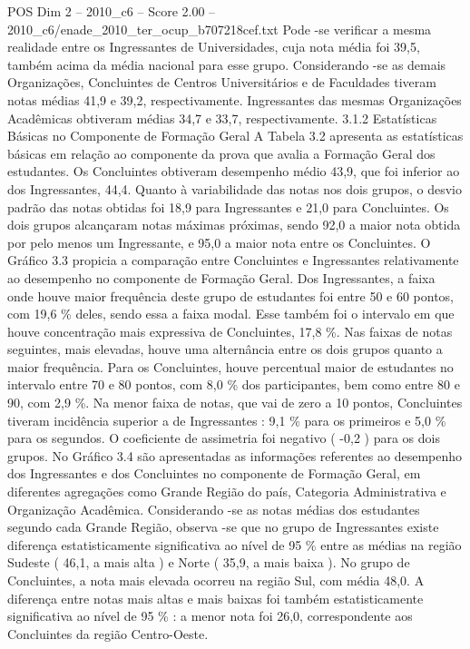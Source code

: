 \begin{textsample}{POS Dim 2 – 2010\_c6 – Score 2.00 – 2010\_c6/enade\_2010\_ter\_ocup\_b707218cef.txt}
Pode -se verificar a mesma realidade entre os Ingressantes de Universidades, cuja nota média foi 39,5, também acima da média nacional para esse grupo.
Considerando -se as demais Organizações, Concluintes de Centros Universitários e de Faculdades tiveram notas médias 41,9 e 39,2, respectivamente.
Ingressantes das mesmas Organizações Acadêmicas obtiveram médias 34,7 e 33,7, respectivamente. 3.1.2 Estatísticas Básicas no Componente de Formação Geral A Tabela 3.2 apresenta as estatísticas básicas em relação ao componente da prova que avalia a Formação Geral dos estudantes.
Os Concluintes obtiveram desempenho médio 43,9, que foi inferior ao dos Ingressantes, 44,4.
Quanto à variabilidade das notas nos dois grupos, o desvio padrão das notas obtidas foi 18,9 para Ingressantes e 21,0 para Concluintes.
Os dois grupos alcançaram notas máximas próximas, sendo 92,0 a maior nota obtida por pelo menos um Ingressante, e 95,0 a maior nota entre os Concluintes.
O Gráfico 3.3 propicia a comparação entre Concluintes e Ingressantes relativamente ao desempenho no componente de Formação Geral.
Dos Ingressantes, a faixa onde houve maior frequência deste grupo de estudantes foi entre 50 e 60 pontos, com 19,6 \% deles, sendo essa a faixa modal.
Esse também foi o intervalo em que houve concentração mais expressiva de Concluintes, 17,8 \%.
Nas faixas de notas seguintes, mais elevadas, houve uma alternância entre os dois grupos quanto a maior frequência.
Para os Concluintes, houve percentual maior de estudantes no intervalo entre 70 e 80 pontos, com 8,0 \% dos participantes, bem como entre 80 e 90, com 2,9 \%.
Na menor faixa de notas, que vai de zero a 10 pontos, Concluintes tiveram incidência superior a de Ingressantes : 9,1 \% para os primeiros e 5,0 \% para os segundos.
O coeficiente de assimetria foi negativo ( -0,2 ) para os dois grupos.
No Gráfico 3.4 são apresentadas as informações referentes ao desempenho dos Ingressantes e dos Concluintes no componente de Formação Geral, em diferentes agregações como Grande Região do país, Categoria Administrativa e Organização Acadêmica.
Considerando -se as notas médias dos estudantes segundo cada Grande Região, observa -se que no grupo de Ingressantes existe diferença estatisticamente significativa ao nível de 95 \% entre as médias na região Sudeste ( 46,1, a mais alta ) e Norte ( 35,9, a mais baixa ).
No grupo de Concluintes, a nota mais elevada ocorreu na região Sul, com média 48,0.
A diferença entre notas mais altas e mais baixas foi também estatisticamente significativa ao nível de 95 \% : a menor nota foi 26,0, correspondente aos Concluintes da região Centro-Oeste.

\end{textsample}
